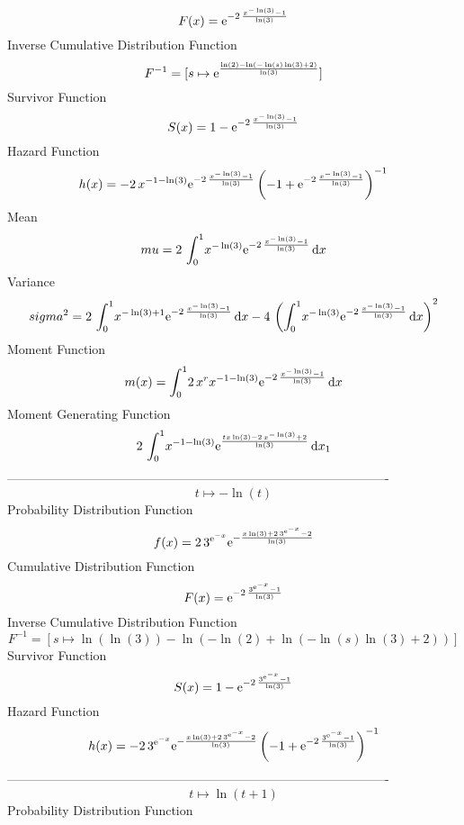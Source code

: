 \documentclass[12pt]{article}
\begin{document}
 $$F(x)={{\rm e}^{-2\,{\frac {{x}^{-\ln  \left( 3 \right) }-1}{\ln  \left( 3
 \right) }}}}
$$ Inverse Cumulative Distribution Function 
  $$F^{-1} = [s\mapsto {{\rm e}^{{\frac {\ln  \left( 2 \right) -\ln  \left( -\ln 
 \left( s \right) \ln  \left( 3 \right) +2 \right) }{\ln  \left( 3
 \right) }}}}]
$$Survivor Function 
 $$ S(x)=1-{{\rm e}^{-2\,{\frac {{x}^{-\ln  \left( 3 \right) }-1}{\ln  \left( 3
 \right) }}}}
$$ Hazard Function 
 $$ h(x)=-2\,{{x}^{-1-\ln  \left( 3 \right) }{{\rm e}^{-2\,{\frac {{x}^{-\ln 
 \left( 3 \right) }-1}{\ln  \left( 3 \right) }}}} \left( -1+{{\rm e}^{
-2\,{\frac {{x}^{-\ln  \left( 3 \right) }-1}{\ln  \left( 3 \right) }}}
} \right) ^{-1}}
$$Mean 
 $$ mu=2\,\int_{0}^{1}\!{x}^{-\ln  \left( 3 \right) }{{\rm e}^{-2\,{\frac {{x
}^{-\ln  \left( 3 \right) }-1}{\ln  \left( 3 \right) }}}}\,{\rm d}x
$$ Variance 
 $$ sigma^2 = 2\,\int_{0}^{1}\!{x}^{-\ln  \left( 3 \right) +1}{{\rm e}^{-2\,{\frac {
{x}^{-\ln  \left( 3 \right) }-1}{\ln  \left( 3 \right) }}}}\,{\rm d}x-
4\, \left( \int_{0}^{1}\!{x}^{-\ln  \left( 3 \right) }{{\rm e}^{-2\,{
\frac {{x}^{-\ln  \left( 3 \right) }-1}{\ln  \left( 3 \right) }}}}
\,{\rm d}x \right) ^{2}
$$Moment Function 
 $$ m(x) = \int_{0}^{1}\!2\,{x}^{r}{x}^{-1-\ln  \left( 3 \right) }{{\rm e}^{-2\,{
\frac {{x}^{-\ln  \left( 3 \right) }-1}{\ln  \left( 3 \right) }}}}
\,{\rm d}x
$$ Moment Generating Function 
 $$2\,\int_{0}^{1}\!{x}^{-1-\ln  \left( 3 \right) }{{\rm e}^{{\frac {tx
\ln  \left( 3 \right) -2\,{x}^{-\ln  \left( 3 \right) }+2}{\ln 
 \left( 3 \right) }}}}\,{\rm d}x_{{1}}
$$-------------------------------------------------------------------------------------------  \\$$t\mapsto -\ln  \left( t \right) 
$$Probability Distribution Function 
$$  f(x)=2\,{3}^{{{\rm e}^{-x}}}{{\rm e}^{-{\frac {x\ln  \left( 3 \right) +2\,{
3}^{{{\rm e}^{-x}}}-2}{\ln  \left( 3 \right) }}}}
$$Cumulative Distribution Function  
 $$F(x)={{\rm e}^{-2\,{\frac {{3}^{{{\rm e}^{-x}}}-1}{\ln  \left( 3 \right) }}
}}
$$ Inverse Cumulative Distribution Function 
  $$F^{-1} = [s\mapsto \ln  \left( \ln  \left( 3 \right)  \right) -\ln  \left( -
\ln  \left( 2 \right) +\ln  \left( -\ln  \left( s \right) \ln  \left( 
3 \right) +2 \right)  \right) ]
$$Survivor Function 
 $$ S(x)=1-{{\rm e}^{-2\,{\frac {{3}^{{{\rm e}^{-x}}}-1}{\ln  \left( 3 \right) 
}}}}
$$ Hazard Function 
 $$ h(x)=-2\,{{3}^{{{\rm e}^{-x}}}{{\rm e}^{-{\frac {x\ln  \left( 3 \right) +2
\,{3}^{{{\rm e}^{-x}}}-2}{\ln  \left( 3 \right) }}}} \left( -1+{
{\rm e}^{-2\,{\frac {{3}^{{{\rm e}^{-x}}}-1}{\ln  \left( 3 \right) }}}
} \right) ^{-1}}
$$-------------------------------------------------------------------------------------------  \\$$t\mapsto \ln  \left( t+1 \right) 
$$Probability Distribution Function 
\end{document}
